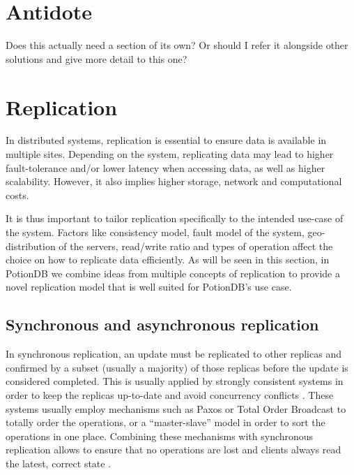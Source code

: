 \section{Antidote}

Does this actually need a section of its own? Or should I refer it alongside other solutions and give more detail to this one?

\section{Replication}


In distributed systems, replication is essential to ensure data is available in multiple sites.
Depending on the system, replicating data may lead to higher fault-tolerance and/or lower latency when accessing data, as well as higher scalability.
However, it also implies higher storage, network and computational costs.

It is thus important to tailor replication specifically to the intended use-case of the system.
Factors like consistency model, fault model of the system, geo-distribution of the servers, read/write ratio and types of operation affect the choice on how to replicate data efficiently.
As will be seen in this section, in PotionDB we combine ideas from multiple concepts of replication to provide a novel replication model that is well suited for PotionDB's use case.

\subsection{Synchronous and asynchronous replication}


In synchronous replication, an update must be replicated to other replicas and confirmed by a subset (usually a majority) of those replicas before the update is considered completed.
This is usually applied by strongly consistent systems in order to keep the replicas up-to-date and avoid concurrency conflicts \cite{dynamo, spanner}.
These systems usually employ mechanisms such as Paxos \cite{paxos} or Total Order Broadcast \cite{tob} to totally order the operations, or a ``master-slave'' model in order to sort the operations in one place.
Combining these mechanisms with synchronous replication allows to ensure that no operations are lost and clients always read the latest, correct state \cite{spanner}.

